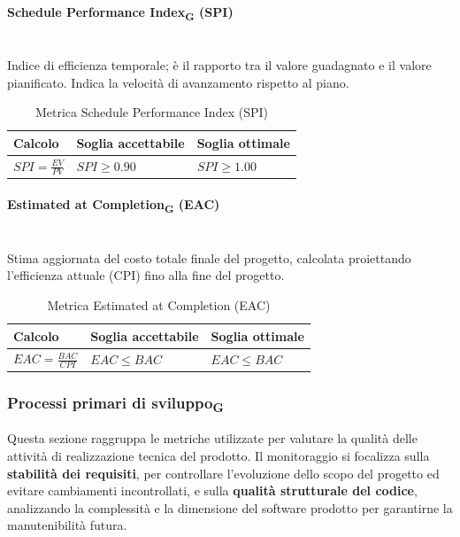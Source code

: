 \documentclass[11pt,a4paper]{article}
\newcommand{\gls}[1]{#1\textsubscript{G}}
\begin{document}
\paragraph{Schedule Performance Index\textsubscript{G} (SPI)} \hfill \\
Indice di efficienza temporale; è il rapporto tra il valore guadagnato e il valore pianificato. Indica la velocità di avanzamento rispetto al piano.

\begin{table}[H]
    \centering
    \renewcommand{\arraystretch}{1.5}
    \begin{tabular}{|M{0.4\textwidth}|M{0.25\textwidth}|M{0.25\textwidth}|}
        \hline
        \textbf{Calcolo} & \textbf{Soglia accettabile} & \textbf{Soglia ottimale} \\
        \hline
        $SPI = \frac{EV}{PV}$ & $SPI \ge 0.90$ & $SPI \ge 1.00$ \\
        \hline
    \end{tabular}
    \caption{Metrica Schedule Performance Index (SPI)}
\end{table}

\paragraph{Estimated at Completion\textsubscript{G} (EAC)} \hfill \\
Stima aggiornata del costo totale finale del progetto, calcolata proiettando l'efficienza attuale (CPI) fino alla fine del progetto.

\begin{table}[H]
    \centering
    \renewcommand{\arraystretch}{1.5}
    \begin{tabular}{|M{0.4\textwidth}|M{0.25\textwidth}|M{0.25\textwidth}|}
        \hline
        \textbf{Calcolo} & \textbf{Soglia accettabile} & \textbf{Soglia ottimale} \\
        \hline
        $EAC = \frac{BAC}{CPI}$ & $EAC \le BAC$ & $EAC \le BAC$ \\
        \hline
    \end{tabular}
    \caption{Metrica Estimated at Completion (EAC)}
\end{table}

\newpage
\subsubsection{\gls{Processi primari di sviluppo}}
Questa sezione raggruppa le metriche utilizzate per valutare la qualità delle attività di realizzazione tecnica del prodotto.
Il monitoraggio si focalizza sulla \textbf{stabilità dei requisiti}, per controllare l'evoluzione dello scopo del progetto ed evitare cambiamenti incontrollati, e sulla \textbf{qualità strutturale del codice}, analizzando la complessità e la dimensione del software prodotto per garantirne la manutenibilità futura.
\end{document}
